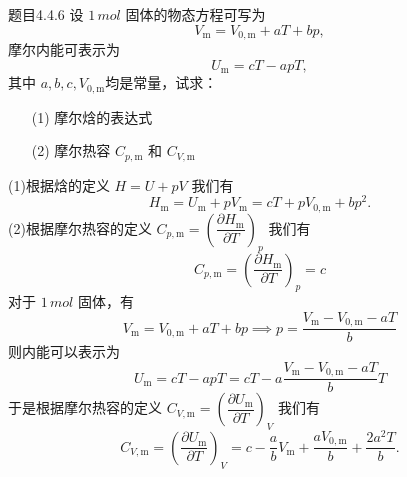 \begin{question}{题目4.4.6}
    设 $1 \,\si{mol}$ 固体的物态方程可写为
    $$
        V_\mathrm{m} = V_\mathrm{0,m} + aT + bp,
    $$
    摩尔内能可表示为
    $$
        U_\mathrm{m} = cT - apT,
    $$
    其中 $a,b,c,V_\mathrm{0,m}$均是常量，试求：
    \begin{enumerate}
        \item[(1)] 摩尔焓的表达式
        \item[(2)] 摩尔热容 $C_{p,\mathrm{m}}$ 和 $C_{V,\mathrm{m}}$
    \end{enumerate}
\end{question}
\begin{solution}
    (1)根据焓的定义 $H = U + pV$ 我们有
    $$
        H_\mathrm{m} = U_\mathrm{m} + pV_\mathrm{m} = cT + pV_{0,\mathrm{m}} + bp^2.
    $$
    (2)根据摩尔热容的定义 $C_{p,\mathrm{m}} = \left( \dfrac{\partial H_\mathrm{m}}{\partial T}\right)_p$ 我们有
    $$
        C_{p,\mathrm{m}} = \left( \frac{\partial H_\mathrm{m}}{\partial T}\right)_p = c
    $$
    对于 $1 \,\si{mol}$ 固体，有
    $$
        V_\mathrm{m} = V_{0,\mathrm{m}} + aT + bp
        \implies
        p = \frac{V_\mathrm{m} - V_\mathrm{0,m} - aT}{b}
    $$
    则内能可以表示为
    $$
        U_\mathrm{m}
        = cT - apT
        = cT - a\frac{V_\mathrm{m} - V_\mathrm{0,m} - aT}{b}T
    $$
    于是根据摩尔热容的定义 $C_{V,\mathrm{m}} = \left( \dfrac{\partial U_\mathrm{m}}{\partial T}\right)_V$ 我们有
    $$
        C_{V,\mathrm{m}}
        = \left(\frac{\partial U_\mathrm{m}}{\partial T}\right)_V
        = c - \frac{a}{b}V_\mathrm{m} + \frac{aV_{0,\mathrm{m}}}{b} + \frac{2a^2T}{b}.
    $$
\end{solution}

